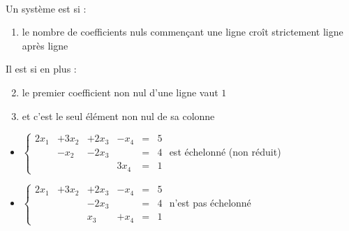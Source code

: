 \begin{frame}
\begin{mydefinition}~\\
Un système est  si :
\begin{enumerate}
  \item le nombre de coefficients nuls commençant une ligne croît strictement ligne après ligne
\end{enumerate}  

\pause

Il est  si en plus : 
\begin{enumerate}
\setcounter{enumi}{1} 
  \item le premier coefficient non nul d'une ligne vaut $1$

  \item et c'est le seul élément non nul de sa colonne
\end{enumerate}
\end{mydefinition}
\pause


\begin{itemize}
  \item $\left\{\begin{array}{cccccc}
2x_1&+3x_2&+2x_3&-x_4&=&5\\
&-x_2&-2x_3&&=&4\\
&&&3x_4&=&1
\end{array}\right.
$ est échelonné (non réduit)

\pause  
  \item $\left\{\begin{array}{cccccc}
2x_1&+3x_2&+2x_3&-x_4&=&5\\
&&-2x_3&&=&4\\
&&x_3&+x_4&=&1
\end{array}\right.
$ n'est pas échelonné  
  
\end{itemize}
  


\end{frame}


